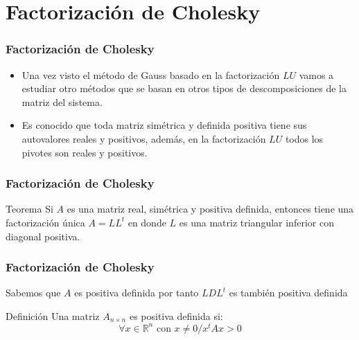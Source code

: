 \documentclass{beamer}
\begin{document}
\section{Factorizaci\'on de Cholesky}
\begin{frame}
  \frametitle{Factorizaci\'on de Cholesky}
  \begin{itemize}
    \item<1-> Una vez visto el m\'etodo de Gauss basado en la factorizaci\'on $LU$ vamos a estudiar otro m\'etodos que se basan en
    otros tipos de descomposiciones de la matriz del sistema.
    \item<2-> Es conocido que toda matriz sim\'etrica y definida positiva tiene sus autovalores reales y positivos, adem\'as, en la
    factorizaci\'on $LU$ todos los pivotes son reales y positivos.
  \end{itemize}
\end{frame}
\begin{frame}
  \frametitle{Factorizaci\'on de Cholesky}
  \begin{block}{Teorema}
      Si $A$ es una matriz real, sim\'etrica y positiva definida, entonces tiene una factorizaci\'on
      \'unica $A=LL^t$ en donde $L$ es una matriz triangular inferior con diagonal positiva.
    \end{block}
\end{frame}
\begin{frame}
  \frametitle{Factorizaci\'on de Cholesky}
  Sabemos que $A$ es positiva definida por tanto $LDL^t$ es tambi\'en positiva definida
  \begin{block}{Definici\'on}
    Una matriz $A_{n\times n}$ es positiva definida si:
    $$
    \forall x \in \mathbb{R}^n \mbox{ con } x\neq 0 / x^tAx>0
    $$
  \end{block}
\end{frame}
\end{document}
